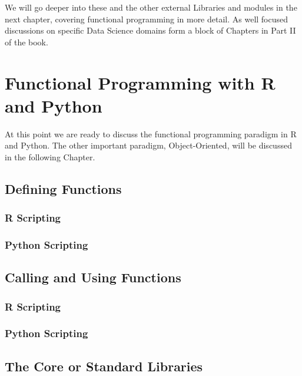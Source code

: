 \documentclass[]{book}
\theoremstyle{definition}
\theoremstyle{definition}
\theoremstyle{definition}
\theoremstyle{remark}
\begin{document}
We will go deeper into these and the other external Libraries and
modules in the next chapter, covering functional programming in more
detail. As well focused discussions on specific Data Science domains
form a block of Chapters in Part II of the book.

\chapter{Functional Programming with R and
Python}\label{functional-programming-with-r-and-python}

At this point we are ready to discuss the functional programming
paradigm in R and Python. The other important paradigm, Object-Oriented,
will be discussed in the following Chapter.

\section{Defining Functions}\label{defining-functions}

\subsection{R Scripting}\label{r-scripting-1}

\subsection{Python Scripting}\label{python-scripting-1}

\section{Calling and Using Functions}\label{calling-and-using-functions}

\subsection{R Scripting}\label{r-scripting-2}

\subsection{Python Scripting}\label{python-scripting-2}

\section{The Core or Standard
Libraries}\label{the-core-or-standard-libraries}
\end{document}
